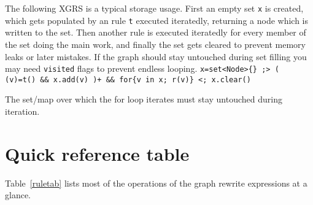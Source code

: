\begin{example}
The following XGRS is a typical storage usage.
First an empty set \texttt{x} is created, which gets populated by an rule \texttt{t} executed iteratedly, returning a node which is written to the set.
Then another rule is executed iteratedly for every member of the set doing the main work, and finally the set gets cleared to prevent memory leaks or later mistakes.
If the graph should stay untouched during set filling you may need \texttt{visited} flags to prevent endless looping.
\verb#x=set<Node>{} ;> ( (v)=t() && x.add(v) )+ && for{v in x; r(v)} <; x.clear()#
\end{example}

\begin{note}
The set/map over which the for loop iterates must stay untouched during iteration.
\end{note}


\section{Quick reference table}

Table~\ref{ruletab} lists most of the operations of the graph rewrite expressions at a glance.

